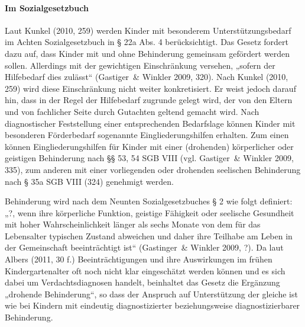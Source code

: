 \paragraph{Im Sozialgesetzbuch}
Laut Kunkel (2010, 259) werden Kinder mit besonderem Unterstützungsbedarf im Achten Sozialgesetzbuch in § 22a Abs. 4 berücksichtigt. Das Gesetz fordert dazu auf, dass Kinder mit und ohne Behinderung gemeinsam gefördert werden sollen. Allerdings mit der gewichtigen Einschränkung versehen, „sofern der Hilfebedarf dies zulässt“ (Gastiger~\& Winkler 2009, 320). Nach Kunkel (2010, 259) wird diese Einschränkung nicht weiter konkretisiert. Er weist jedoch darauf hin, dass in der Regel der Hilfebedarf zugrunde gelegt wird, der von den Eltern und von fachlicher Seite durch Gutachten geltend gemacht wird. Nach diagnostischer Feststellung einer entsprechenden Bedarfslage können Kinder mit besonderen Förderbedarf sogenannte Eingliederungshilfen erhalten. Zum einen können Eingliederungshilfen für Kinder mit einer (drohenden) körperlicher oder geistigen Behinderung nach §§ 53, 54 SGB VIII (vgl. Gastiger~\& Winkler 2009, 335), zum anderen mit einer vorliegenden oder drohenden seelischen Behinderung nach § 35a SGB VIII (324) genehmigt werden.
 
Behinderung wird nach dem Neunten Sozialgesetzbuches § 2 wie folgt definiert: „?, wenn ihre körperliche Funktion, geistige Fähigkeit oder seelische Gesundheit mit hoher Wahrscheinlichkeit länger als sechs Monate von dem für das Lebensalter typischen Zustand abweichen und daher ihre Teilhabe am Leben in der Gemeinschaft beeinträchtigt ist“ (Gastinger~\& Winkler 2009, ?). Da laut Albers (2011, 30 f.) Beeinträchtigungen und ihre Auswirkungen im frühen Kindergartenalter oft noch nicht klar eingeschätzt werden können und es sich dabei um Verdachtsdiagnosen handelt, beinhaltet das Gesetz die Ergänzung „drohende Behinderung“, so dass der Anspruch auf Unterstützung der gleiche ist wie bei Kindern mit eindeutig diagnostizierter beziehungsweise diagnostizierbarer Behinderung. 

